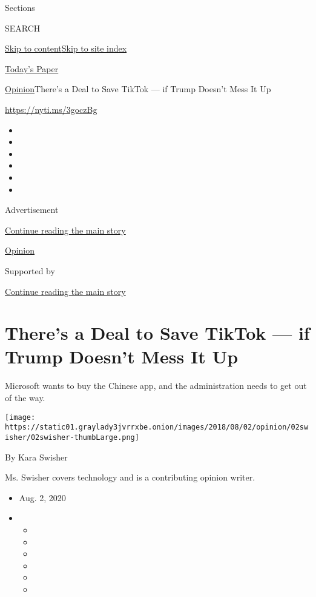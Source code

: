 Sections

SEARCH

\protect\hyperlink{site-content}{Skip to
content}\protect\hyperlink{site-index}{Skip to site index}

\href{https://myaccount.nytimes3xbfgragh.onion/auth/login?response_type=cookie\&client_id=vi}{}

\href{https://www.nytimes3xbfgragh.onion/section/todayspaper}{Today's
Paper}

\href{/section/opinion}{Opinion}\textbar{}There's a Deal to Save TikTok
--- if Trump Doesn't Mess It Up

\url{https://nyti.ms/3goczBg}

\begin{itemize}
\item
\item
\item
\item
\item
\item
\end{itemize}

Advertisement

\protect\hyperlink{after-top}{Continue reading the main story}

\href{/section/opinion}{Opinion}

Supported by

\protect\hyperlink{after-sponsor}{Continue reading the main story}

\hypertarget{theres-a-deal-to-save-tiktok--if-trump-doesnt-mess-it-up}{%
\section{There's a Deal to Save TikTok --- if Trump Doesn't Mess It
Up}\label{theres-a-deal-to-save-tiktok--if-trump-doesnt-mess-it-up}}

Microsoft wants to buy the Chinese app, and the administration needs to
get out of the way.

\texttt{[image: https://static01.graylady3jvrrxbe.onion/images/2018/08/02/opinion/02swisher/02swisher-thumbLarge.png]}

By Kara Swisher

Ms. Swisher covers technology and is a contributing opinion writer.

\begin{itemize}
\item
  Aug. 2, 2020
\item
  \begin{itemize}
  \item
  \item
  \item
  \item
  \item
  \item
  \end{itemize}
\end{itemize}

